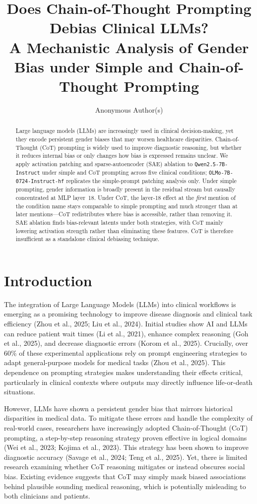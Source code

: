 \documentclass{article}
\title{Does Chain-of-Thought Prompting Debias Clinical LLMs?\\
A Mechanistic Analysis of Gender Bias under Simple and Chain-of-Thought Prompting}
\author{Anonymous Author(s)}
\begin{document}
\maketitle

\begin{abstract}
Large language models (LLMs) are increasingly used in clinical decision-making, yet they encode persistent gender biases that may worsen healthcare disparities. Chain-of-Thought (CoT) prompting is widely used to improve diagnostic reasoning, but whether it reduces internal bias or only changes how bias is expressed remains unclear. We apply activation patching and sparse-autoencoder (SAE) ablation to \texttt{Qwen2.5-7B-Instruct} under simple and CoT prompting across five clinical conditions; \texttt{OLMo-7B-0724-Instruct-hf} replicates the simple-prompt patching analysis only. Under simple prompting, gender information is broadly present in the residual stream but causally concentrated at MLP layer~18. Under CoT, the layer-18 effect at the \emph{first} mention of the condition name stays comparable to simple prompting and much stronger than at later mentions---CoT redistributes where bias is accessible, rather than removing it. SAE ablation finds bias-relevant latents under both strategies, with CoT mainly lowering activation strength rather than eliminating these features. CoT is therefore insufficient as a standalone clinical debiasing technique.
\end{abstract}
\section{Introduction}

The integration of Large Language Models (LLMs) into clinical workflows is emerging as a promising technology to improve disease diagnosis and clinical task efficiency (Zhou et al., 2025; Liu et al., 2024). Initial studies show AI and LLMs can reduce patient wait times (Li et al., 2021), enhance complex reasoning (Goh et al., 2025), and decrease diagnostic errors (Korom et al., 2025). Crucially, over 60\% of these experimental applications rely on prompt engineering strategies to adapt general-purpose models for medical tasks (Zhou et al., 2025). This dependence on prompting strategies makes understanding their effects critical, particularly in clinical contexts where outputs may directly influence life-or-death situations.

However, LLMs have shown a persistent gender bias that mirrors historical disparities in medical data. To mitigate these errors and handle the complexity of real-world cases, researchers have increasingly adopted Chain-of-Thought (CoT) prompting, a step-by-step reasoning strategy proven effective in logical domains (Wei et al., 2023; Kojima et al., 2023). This strategy has been shown to improve diagnostic accuracy (Savage et al., 2024; Teng et al., 2025). Yet, there is limited research examining whether CoT reasoning mitigates or instead obscures social bias. Existing evidence suggests that CoT may simply mask biased associations behind plausible sounding medical reasoning, which is potentially misleading to both clinicians and patients.
\end{document}
